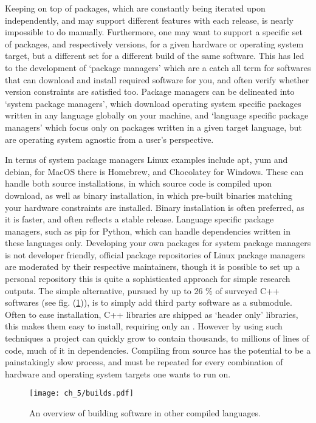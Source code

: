 Keeping on top of packages, which are constantly being iterated upon independently, and may support different features with each release, is nearly impossible to do manually. Furthermore, one may want to support a specific set of packages, and respectively versions, for a given hardware or operating system target, but a different set for a different build of the same software. This has led to the development of `package managers' which are a catch all term for softwares that can download and install required software for you, and often verify whether version constraints are satisfied too. Package managers can be delineated into `system package managers', which download operating system specific packages written in any language globally on your machine, and `language specific package managers' which focus only on packages written in a given target language, but are operating system agnostic from a user's perspective.

In terms of system package managers Linux examples include apt, yum and debian, for MacOS there is Homebrew, and Chocolatey for Windows. These can handle both source installations, in which source code is compiled upon download, as well as binary installation, in which pre-built binaries matching your hardware constraints are installed. Binary installation is often preferred, as it is faster, and often reflects a stable release. Language specific package managers, such as pip for Python, which can handle dependencies written in these languages only. Developing your own packages for system package managers is not developer friendly, official package repositories of Linux package managers are moderated by their respective maintainers, though it is possible to set up a personal repository this is quite a sophisticated approach for simple research outputs. The simple alternative, pursued by up to 26 \% of surveyed C++ softwares (see fig. (\ref{fig:sec_2_3:builds})), is to simply add third party software as a submodule. Often to ease installation, C++ libraries are shipped as `header only' libraries, this makes them easy to install, requiring only an . However by using such techniques a project can quickly grow to contain thousands, to millions of lines of code, much of it in dependencies. Compiling from source has the potential to be a painstakingly slow process, and must be repeated for every combination of hardware and operating system targets one wants to run on.

\begin{figure}
    \centerline{\texttt{[image: ch\_5/builds.pdf]}}
    \caption{An overview of building software in other compiled languages.}
    \label{fig:sec_2_3:builds}
\end{figure}


